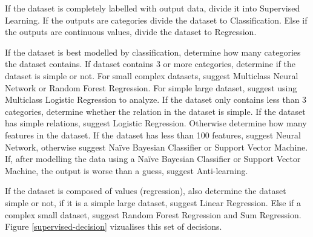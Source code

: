 \documentclass[titlepage]{article}
\begin{document}
If the dataset is completely labelled with output data, divide it into Supervised Learning. If the outputs are categories divide the dataset to Classification. Else if the outputs are continuous values, divide the dataset to Regression.

If the dataset is best modelled by classification, determine how many categories the dataset contains. If dataset contains 3 or more categories, determine if the dataset is simple or not. For small complex datasets, suggest Multiclass Neural Network or Random Forest Regression. For simple large dataset, suggest using Multiclass Logistic Regression to analyze. If the dataset only contains less than 3 categories, determine whether the relation in the dataset is simple. If the dataset has simple relations, suggest Logistic Regression. Otherwise determine how many features in the dataset. If the dataset has less than 100 features, suggest Neural Network, otherwise suggest Naïve Bayesian Classifier or Support Vector Machine. If, after modelling the data using a Naïve Bayesian Classifier or Support Vector Machine, the output is worse than a guess, suggest Anti-learning.

If the dataset is composed of values (regression), also determine the dataset simple or not, if it is a simple large dataset, suggest Linear Regression. Else if a complex small dataset, suggest Random Forest Regression and Sum Regression. Figure \ref{supervised-decision} vizualises this set of decisions.
\end{document}
